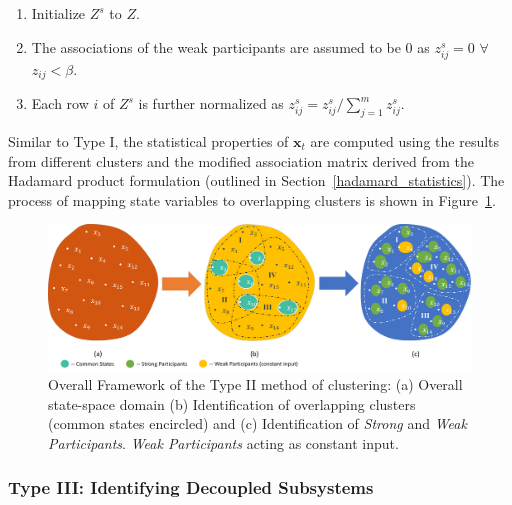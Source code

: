 \begin{enumerate}
\item Initialize $Z^s$ to $Z$. 
\item The associations of the weak participants are assumed to be 0 as $z^s_{ij} = 0 $ $\forall$ $z_{ij} < \beta$.
\item Each row $i$ of $Z^s$ is further normalized as $z_{ij}^s = z_{ij}^s/ \sum_{j = 1}^m z_{ij}^s$.
\end{enumerate}

Similar to Type I, the statistical properties of $\textbf{x}_t$ are computed using the results from different clusters and the modified association matrix derived from the Hadamard product formulation (outlined in Section~\ref{hadamard_statistics}). The process of mapping state variables to overlapping clusters is shown in Figure~\ref{framework_TypeII}. 

\begin{figure}[H]
\begin{center}
\includegraphics[width=\textwidth]{figures_2/TypeII}
\caption{Overall Framework of the Type II method of clustering: (a) Overall state-space domain (b) Identification of overlapping clusters (common states encircled) and (c) Identification of \textit{Strong} and \textit{Weak Participants}. \textit{Weak Participants} acting as constant input.}
\label{framework_TypeII}
\end{center}
\end{figure}

\subsubsection{Type III: Identifying Decoupled Subsystems}

